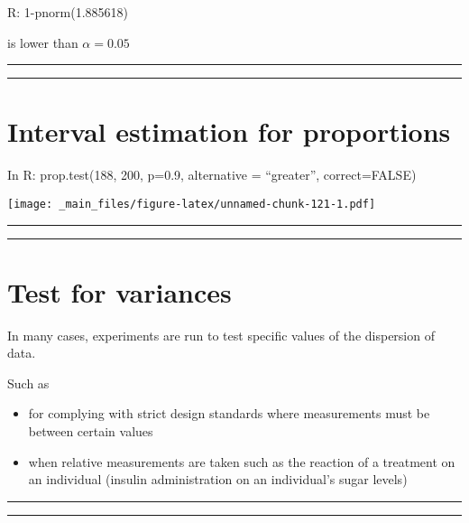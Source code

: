 \documentclass[
]{book}
\providecommand{\tightlist}{%
  \setlength{\itemsep}{0pt}\setlength{\parskip}{0pt}}
\begin{document}
R: 1-pnorm(1.885618)

is lower than \(\alpha=0.05\)

\begin{center}\rule{0.5\linewidth}{0.5pt}\end{center}

\begin{center}\rule{0.5\linewidth}{0.5pt}\end{center}

\hypertarget{interval-estimation-for-proportions-8}{%
\section{Interval estimation for proportions}\label{interval-estimation-for-proportions-8}}

In R: prop.test(188, 200, p=0.9, alternative = ``greater'', correct=FALSE)

\texttt{[image: \_main\_files/figure-latex/unnamed-chunk-121-1.pdf]}

\begin{center}\rule{0.5\linewidth}{0.5pt}\end{center}

\begin{center}\rule{0.5\linewidth}{0.5pt}\end{center}

\hypertarget{test-for-variances}{%
\section{Test for variances}\label{test-for-variances}}

In many cases, experiments are run to test specific values of the dispersion of data.

Such as

\begin{itemize}
\tightlist
\item
  for complying with strict design standards where measurements must be between certain values
\item
  when relative measurements are taken such as the reaction of a treatment on an individual (insulin administration on an individual's sugar levels)
\end{itemize}

\begin{center}\rule{0.5\linewidth}{0.5pt}\end{center}

\begin{center}\rule{0.5\linewidth}{0.5pt}\end{center}
\end{document}
